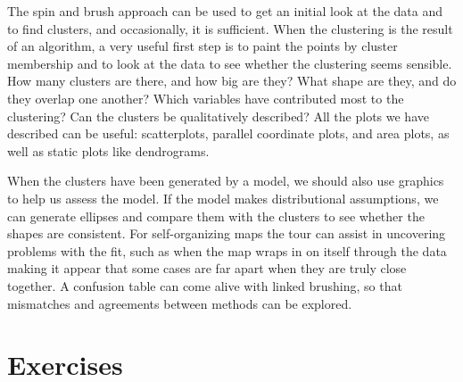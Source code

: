 The spin and brush approach can be used to get an initial look at the
data and to find clusters, and occasionally, it is sufficient.  When
the clustering is the result of an algorithm, a very useful first step
is to paint the points by cluster membership and to look at the data to
see whether the clustering seems sensible.  How many clusters are
there, and how big are they?  What shape are they, and do they overlap
one another?  Which variables have contributed most to the clustering?
Can the clusters be qualitatively described?  All the plots we have
described can be useful: scatterplots, parallel coordinate plots, and
area plots, as well as static plots like dendrograms.

When the clusters have been generated by a model, we should also use
graphics to help us assess the model.  If the model makes
distributional assumptions, we can generate ellipses and compare them
with the clusters to see whether the shapes are consistent.  For
self-organizing maps the tour can assist in uncovering problems with
the fit, such as when the map wraps in on itself through the data
making it appear that some cases are far apart when they are truly
close together. A confusion table can come alive with linked brushing,
so that mismatches and agreements between methods can be
explored. 


\section*{Exercises}

